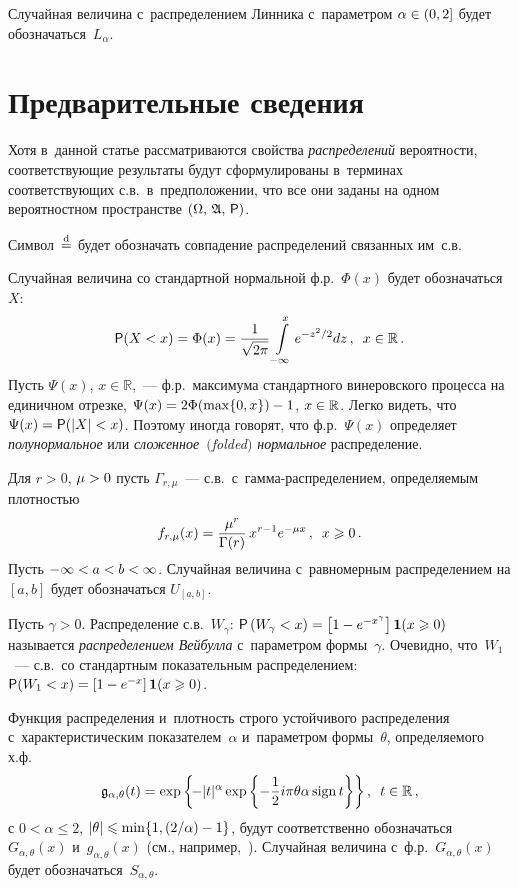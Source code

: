 \begin{multicols}{2}
Случайная величина с~распределением Линника с~параметром $\alpha\hm\in(0,2]$ будет
обозначаться~$L_{\alpha}$.

\section{Предварительные сведения}

Хотя в~данной статье рассматриваются свойства {\it распределений}
вероятности, соответствующие результаты будут сформулированы 
в~терминах соответствующих с.в.\ в~предположении, что все они заданы
на одном вероятностном пространстве $(\Omega,\,\mathfrak{A},\,{\sf
P})$.

Символ~$\stackrel{\mathrm{d}}{=}$ будет обозначать совпадение распределений связанных им~с.в.

Случайная величина со стандартной нормальной ф.р.~$\Phi(x)$ будет обозначаться~$X$:
$$
{\sf P}(X<x)=\Phi(x)=\displaystyle\frac{\displaystyle 1\mathstrut}{\displaystyle \sqrt{2\pi}\mathstrut}\int\limits_{-\infty}^{x}e^{-z^2/2}dz\,,\enskip
x\in\mathbb{R}\,.
$$
Пусть $\Psi(x)$, $x\in\mathbb{R}$,~--- ф.р.\ максимума стандартного
винеровского процесса на единичном отрезке,
$\Psi(x)\hm=2\Phi(\max\{0,x\})\hm-1$, $x\hm\in\mathbb{R}$. Легко
видеть, что $\Psi(x)\hm={\sf P}(|X|<x)$. Поэтому иногда говорят, что ф.р.~$\Psi(x)$ 
определяет {\it полунормальное} или {\it сложенное~$($folded$)$ нормальное} 
распределение.

Для $r>0$, $\mu\hm>0$ пусть $\Gamma_{r,\mu}$~--- с.в.\ 
с~гам\-ма-рас\-пре\-де\-ле\-ни\-ем, определяемым плотностью
$$
f_{r,\mu}(x)=\displaystyle\frac{\displaystyle \mu^r\mathstrut}{\displaystyle \Gamma(r)\mathstrut}\,x^{r-1}e^{-\mu x}\,,\enskip x\geqslant 0\,.
$$
Пусть $-\infty\hm<a\hm< b\hm< \infty$. Случайная величина с~равномерным
распределением на $[a,b]$ будет обозначаться $U_{[a,b]}$.

Пусть $\gamma>0$. Распределение с.в.~$W_{\gamma}$: $ {\sf P}\left(W_{\gamma}<x\right)
\hm=\left[1\hm-e^{-x^{\gamma}}\right]\mathbf{1}(x\hm\geqslant
0)$ называется {\it распределением Вейбулла} с~параметром формы~$\gamma$.\linebreak 
Очевидно, что~$W_1$~--- с.в.\ со стандартным показательным
распределением: ${\sf P}(W_1\hm<x)\hm=\left[1\hm-e^{-x}\right]{\bf 1}(x\hm\geqslant0)$.

Функция распределения и~плотность строго устойчивого распределения 
с~характеристическим показателем~$\alpha$ и~параметром формы~$\theta$,
опре\-де\-ля\-емо\-го х.ф.
$$
\mathfrak{g}_{\alpha,\theta}(t)=\exp\left\{\!
- |t|^{\alpha}\exp\left\{-\displaystyle\frac{\displaystyle 1\mathstrut}{\displaystyle 2\mathstrut}i\pi\theta\alpha\,\mathrm{sign}\,t\right\}\right\},\enskip
t\in\mathbb{R}\,,
$$
с $0<\alpha\leqslant2$, $|\theta|\hm\leqslant\min\{1,({2}/{\alpha})-1\}$, будут
соответственно обозначаться $G_{\alpha,\theta}(x)$ 
и~$g_{\alpha,\theta}(x)$ (см., например,~\cite{Zolotarev1983}). Случайная величина
с~ф.р.~$G_{\alpha,\theta}(x)$ будет обозначаться~$S_{\alpha,\theta}$.


\end{multicols}
